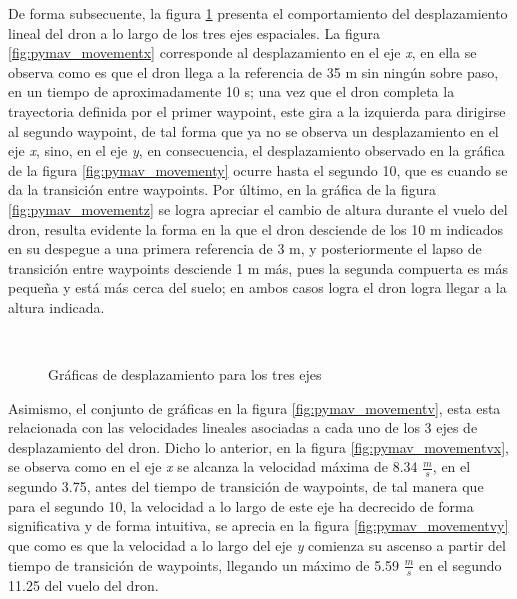 De forma subsecuente, la figura \ref{fig:pymav_movementd} presenta el comportamiento del desplazamiento lineal del dron a lo largo de los tres ejes espaciales. La figura \ref{fig:pymav_movementx} corresponde al desplazamiento en el eje \textit{x}, en ella se observa como es que el dron llega a la referencia de 35 m sin ningún sobre paso, en un tiempo de aproximadamente 10 s; una vez que el dron completa la trayectoria definida por el primer waypoint, este gira a la izquierda para dirigirse al segundo waypoint, de tal forma que ya no se observa un desplazamiento en el eje \textit{x}, sino, en el eje \textit{y}, en consecuencia, el desplazamiento observado en la gráfica de la figura \ref{fig:pymav_movementy} ocurre hasta el segundo 10, que es cuando se da la transición entre waypoints. Por último, en la gráfica de la figura \ref{fig:pymav_movementz} se logra apreciar el cambio de altura durante el vuelo del dron, resulta evidente la forma en la que el dron desciende de los 10 m indicados en su despegue a una primera referencia de 3 m, y posteriormente el lapso de transición entre waypoints desciende 1 m más, pues la segunda compuerta es más pequeña y está más cerca del suelo; en ambos casos logra el dron logra llegar a la altura indicada.

\begin{figure}[ht]
    \centering
    \hfill
    \\
    \hfill

    \caption{Gráficas de desplazamiento para los tres ejes}
    \label{fig:pymav_movementd}
\end{figure}

Asimismo, el conjunto de gráficas en la figura \ref{fig:pymav_movementv}, esta esta relacionada con las velocidades lineales asociadas a cada uno de los 3 ejes de desplazamiento del dron. Dicho lo anterior, en la figura \ref{fig:pymav_movementvx}, se observa como en el eje \textit{x} se alcanza la velocidad máxima de 8.34 $\frac{m}{s}$, en el segundo 3.75, antes del tiempo de transición de waypoints, de tal manera que para el segundo 10, la velocidad a lo largo de este eje ha decrecido de forma significativa y de forma intuitiva, se aprecia en la figura \ref{fig:pymav_movementvy} que como es que la velocidad a lo largo del eje \textit{y} comienza su ascenso a partir del tiempo de transición de waypoints, llegando un máximo de 5.59 $\frac{m}{s}$ en el segundo 11.25 del vuelo del dron. 


